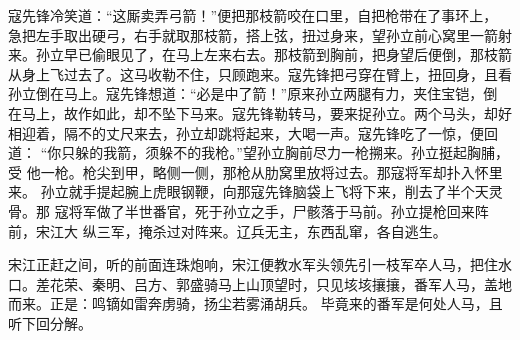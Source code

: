 寇先锋冷笑道：“这厮卖弄弓箭！”便把那枝箭咬在口里，自把枪带在了事环上，
急把左手取出硬弓，右手就取那枝箭，搭上弦，扭过身来，望孙立前心窝里一箭射
来。孙立早已偷眼见了，在马上左来右去。那枝箭到胸前，把身望后便倒，那枝箭
从身上飞过去了。这马收勒不住，只顾跑来。寇先锋把弓穿在臂上，扭回身，且看
孙立倒在马上。寇先锋想道：“必是中了箭！”原来孙立两腿有力，夹住宝铠，倒
在马上，故作如此，却不坠下马来。寇先锋勒转马，要来捉孙立。两个马头，却好
相迎着，隔不的丈尺来去，孙立却跳将起来，大喝一声。寇先锋吃了一惊，便回道：
“你只躲的我箭，须躲不的我枪。”望孙立胸前尽力一枪搠来。孙立挺起胸脯，受
他一枪。枪尖到甲，略侧一侧，那枪从肋窝里放将过去。那寇将军却扑入怀里来。
孙立就手提起腕上虎眼钢鞭，向那寇先锋脑袋上飞将下来，削去了半个天灵骨。那
寇将军做了半世番官，死于孙立之手，尸骸落于马前。孙立提枪回来阵前，宋江大
纵三军，掩杀过对阵来。辽兵无主，东西乱窜，各自逃生。

宋江正赶之间，听的前面连珠炮响，宋江便教水军头领先引一枝军卒人马，把住水
口。差花荣、秦明、吕方、郭盛骑马上山顶望时，只见垓垓攘攘，番军人马，盖地
而来。正是：鸣镝如雷奔虏骑，扬尘若雾涌胡兵。
毕竟来的番军是何处人马，且听下回分解。